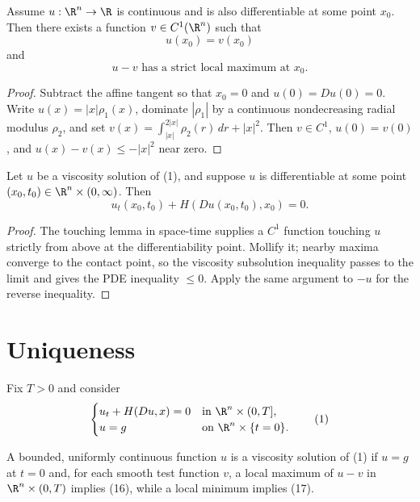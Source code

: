 \begin{lemma}
\label{lem:touching-by-c1-function}
Assume $u : \R^n \to \R$ is continuous and is also differentiable at some point $x_0$. Then there exists a function $v \in C^1(\R^n)$ such that
\[
u(x_0) = v(x_0)
\tag{18}
\]
and
\[
u - v \text{ has a strict local maximum at } x_0.
\tag{19}
\]
\end{lemma}

\begin{proof}
\sketch Subtract the affine tangent so that $x_0=0$ and $u(0)=Du(0)=0$. Write $u(x)=|x|\rho_1(x)$, dominate $|\rho_1|$ by a continuous nondecreasing radial modulus $\rho_2$, and set $v(x)=\int_{|x|}^{2|x|}\rho_2(r)\,dr+|x|^2$. Then $v\in C^1$, $u(0)=v(0)$, and $u(x)-v(x)\leq-|x|^2$ near zero.
\end{proof}

\begin{theorem}
\label{thm:consistency-viscosity-solutions}
Let $u$ be a viscosity solution of (1), and suppose $u$ is differentiable at some point $(x_0, t_0) \in \R^n \times (0, \infty)$. Then
\[
u_t(x_0, t_0) + H(Du(x_0, t_0), x_0) = 0.
\]
\end{theorem}

\begin{proof}
\sketch The touching lemma in space-time supplies a $C^1$ function touching $u$ strictly from above at the differentiability point. Mollify it; nearby maxima converge to the contact point, so the viscosity subsolution inequality passes to the limit and gives the PDE inequality $\leq0$. Apply the same argument to $-u$ for the reverse inequality.
\end{proof}

\section{Uniqueness}
\label{sec:hj-uniqueness}

Fix $T>0$ and consider
\[
\begin{cases}
u_t+H(Du,x)=0 & \text{in }\R^n\times(0,T],\\
u=g & \text{on }\R^n\times\{t=0\}.
\end{cases}
\tag{1}
\]

\begin{definition}
\label{def:viscosity-solution-finite-horizon}
A bounded, uniformly continuous function $u$ is a viscosity solution of (1) if $u=g$ at $t=0$ and, for each smooth test function $v$, a local maximum of $u-v$ in $\R^n\times(0,T)$ implies (16), while a local minimum implies (17).
\end{definition}

